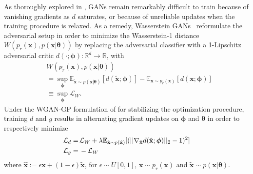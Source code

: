 \documentclass[twocolumn,superscriptaddress,aps]{revtex4-1}
\newcommand{\bftheta}{{\bm \theta}}
\newcommand{\bfphi}{{\bm \phi}}
\theoremstyle{plain}
\begin{document}
As thoroughly explored in \citep{2017arXiv170104862A}, GANs remain remarkably
difficult to train because of vanishing gradients as $d$ saturates, or because of
unreliable updates when the training procedure is relaxed. As a remedy,
Wasserstein GANs~\citep{2017arXiv170107875A} reformulate the adversarial
setup in order to minimize the Wasserstein-1 distance $W( p_r(\mathbf{x} ), p(\mathbf{x} | \bftheta)  )$
by replacing the adversarial classifier with a 1-Lipschitz adversarial critic
$d(\cdot; \bfphi) : \mathbb{R}^d \to \mathbb{R}$, with
\begin{align}
& W( p_r(\mathbf{x} ), p(\mathbf{x} | \bftheta)  ) \nonumber \\
&= \sup_{\bfphi}  \mathbb{E}_{\tilde{\mathbf{x}}\sim p(\mathbf{x}|\bftheta)} [d(\tilde{\mathbf{x}}; \bfphi)] - \mathbb{E}_{\mathbf{x} \sim p_r(\mathbf{x})} [d(\mathbf{x}; \bfphi)] \nonumber \\
&\equiv \sup_{\bfphi} \mathcal{L}_W.
\end{align}
Under the WGAN-GP formulation of \cite{2017arXiv170400028G}
for stabilizing the optimization procedure,
training $d$ and $g$ results in alternating gradient updates on $\bfphi$ and $\bftheta$ in order to respectively minimize
\begin{align}
    {\cal L}_d =\,&  \mathcal{L}_W + \lambda \mathbb{E}_{\hat{\mathbf{x}} \sim p({\hat{\mathbf{x}})}} [(|| \nabla_{\hat{\mathbf{x}}} d({\hat{\mathbf{x}}};\bfphi) ||_2 - 1)^2] \\
    {\cal L}_g =\,& - \mathcal{L}_W
\end{align}
%
where ${\hat{\mathbf{x}}} := \epsilon \mathbf{x} +
(1-\epsilon)\tilde{\mathbf{x}}$, for $\epsilon \sim U[0,1]$, $\mathbf{x} \sim
p_r(\mathbf{x})$ and $\tilde{\mathbf{x}} \sim p(\mathbf{x}|\bftheta)$.
\end{document}
